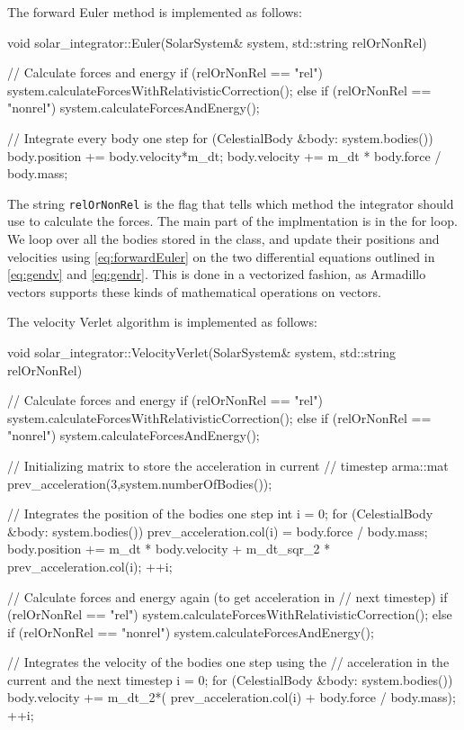 \documentclass[reprint,english,notitlepage]{revtex4-1}  %
\begin{document}
The forward Euler method is implemented as follows:
\begin{cpp}
void solar_integrator::Euler(SolarSystem& system,
							 std::string relOrNonRel) {
  // Calculate forces and energy
  if (relOrNonRel == "rel") {
    system.calculateForcesWithRelativisticCorrection();
  } else if (relOrNonRel == "nonrel") {
    system.calculateForcesAndEnergy();
  }

  // Integrate every body one step
  for (CelestialBody &body: system.bodies()) {
    body.position += body.velocity*m_dt;
    body.velocity += m_dt * body.force / body.mass;
  }
}
\end{cpp}

The string \verb+relOrNonRel+ is the flag that tells which method the integrator should use to calculate the forces.    The main part of the implmentation is in the for loop. We loop over all the bodies stored in the class, and update their positions and velocities using \eqref{eq:forwardEuler} on the two differential equations outlined in \eqref{eq:gendv} and \eqref{eq:gendr}. This is done in a vectorized fashion, as Armadillo \citep{Armadillo} vectors supports these kinds of mathematical operations on vectors.

The velocity Verlet algorithm is implemented as follows:

\begin{cpp}
void solar_integrator::VelocityVerlet(SolarSystem& system,
									  std::string relOrNonRel) {
  // Calculate forces and energy
  if (relOrNonRel == "rel") {
    system.calculateForcesWithRelativisticCorrection();
  } else if (relOrNonRel == "nonrel") {
    system.calculateForcesAndEnergy();
  }

  // Initializing matrix to store the acceleration in current
  // timestep
  arma::mat prev_acceleration(3,system.numberOfBodies());

  // Integrates the position of the bodies one step
  int i = 0;
  for (CelestialBody &body: system.bodies()) {
    prev_acceleration.col(i) = body.force / body.mass;
    body.position += m_dt * body.velocity
    				 + m_dt_sqr_2 * prev_acceleration.col(i);
    ++i;
  }

  // Calculate forces and energy again (to get acceleration in
  // next timestep)
  if (relOrNonRel == "rel") {
    system.calculateForcesWithRelativisticCorrection();
  } else if (relOrNonRel == "nonrel") {
    system.calculateForcesAndEnergy();
  }

  // Integrates the velocity of the bodies one step using the
  // acceleration in the current and the next timestep
  i = 0;
  for (CelestialBody &body: system.bodies()) {
    body.velocity += m_dt_2*( prev_acceleration.col(i)
    				 + body.force / body.mass);
    ++i;
  }
}
\end{cpp}
\end{document}

